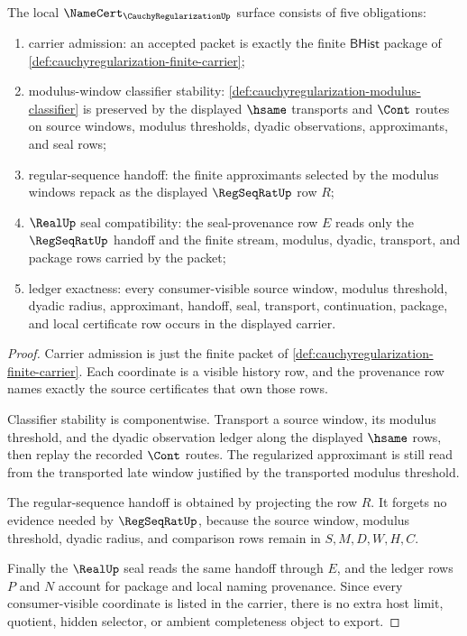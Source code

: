 \begin{theorem}
\label{thm:cauchyregularization-namecert-obligation-surface}
The local $\NameCert_{\CauchyRegularizationUp}$ surface consists of five
obligations:
\begin{enumerate}
\item carrier admission: an accepted packet is exactly the finite
$\mathsf{BHist}$ package of
\autoref{def:cauchyregularization-finite-carrier};
\item modulus-window classifier stability:
\autoref{def:cauchyregularization-modulus-classifier} is preserved by the
displayed $\hsame$ transports and $\Cont$ routes on source windows, modulus
thresholds, dyadic observations, approximants, and seal rows;
\item regular-sequence handoff: the finite approximants selected by the
modulus windows repack as the displayed $\RegSeqRatUp$ row $R$;
\item $\RealUp$ seal compatibility: the seal-provenance row $E$ reads only
the $\RegSeqRatUp$ handoff and the finite stream, modulus, dyadic, transport,
and package rows carried by the packet;
\item ledger exactness: every consumer-visible source window, modulus
threshold, dyadic radius, approximant, handoff, seal, transport, continuation,
package, and local certificate row occurs in the displayed carrier.
\end{enumerate}
\end{theorem}
\begin{proof}
Carrier admission is just the finite packet of
\autoref{def:cauchyregularization-finite-carrier}. Each coordinate is a
visible history row, and the provenance row names exactly the source
certificates that own those rows.

Classifier stability is componentwise. Transport a source window, its modulus
threshold, and the dyadic observation ledger along the displayed $\hsame$
rows, then replay the recorded $\Cont$ routes. The regularized approximant is
still read from the transported late window justified by the transported
modulus threshold.

The regular-sequence handoff is obtained by projecting the row $R$. It
forgets no evidence needed by $\RegSeqRatUp$, because the source window,
modulus threshold, dyadic radius, and comparison rows remain in $S,M,D,W,H,C$.

Finally the $\RealUp$ seal reads the same handoff through $E$, and the ledger
rows $P$ and $N$ account for package and local naming provenance. Since every
consumer-visible coordinate is listed in the carrier, there is no extra host
limit, quotient, hidden selector, or ambient completeness object to export.
\end{proof}

